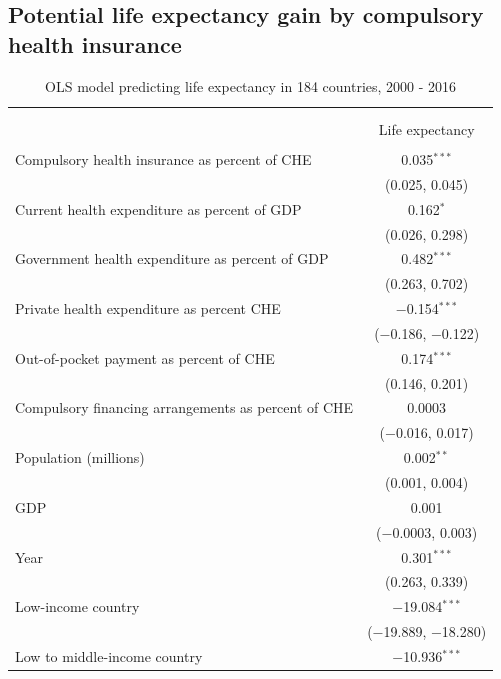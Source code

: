 \documentclass[]{elsarticle} %
\begin{document}
\hypertarget{potential-life-expectancy-gain-by-compulsory-health-insurance}{%
\subsection{Potential life expectancy gain by compulsory health insurance}\label{potential-life-expectancy-gain-by-compulsory-health-insurance}}

\begin{table}[H] \centering 
  \caption{OLS model predicting life expectancy in 184 countries, 2000 - 2016} 
  \label{poolOLS} 
\begin{tabular}{@{\extracolsep{5pt}}lc} 
\\[-1.8ex]\hline \\[-1.8ex] 
\\[-1.8ex] & Life expectancy \\ 
\hline \\[-1.8ex] 
 Compulsory health insurance as percent of CHE & 0.035$^{***}$ \\ 
  & (0.025, 0.045) \\ 
  Current health expenditure as percent of GDP & 0.162$^{*}$ \\ 
  & (0.026, 0.298) \\ 
  Government health expenditure as percent of GDP & 0.482$^{***}$ \\ 
  & (0.263, 0.702) \\ 
  Private health expenditure as percent CHE & $-$0.154$^{***}$ \\ 
  & ($-$0.186, $-$0.122) \\ 
  Out-of-pocket payment as percent of CHE & 0.174$^{***}$ \\ 
  & (0.146, 0.201) \\ 
  Compulsory financing arrangements as percent of CHE & 0.0003 \\ 
  & ($-$0.016, 0.017) \\ 
  Population (millions) & 0.002$^{**}$ \\ 
  & (0.001, 0.004) \\ 
  GDP & 0.001 \\ 
  & ($-$0.0003, 0.003) \\ 
  Year & 0.301$^{***}$ \\ 
  & (0.263, 0.339) \\ 
  Low-income country & $-$19.084$^{***}$ \\ 
  & ($-$19.889, $-$18.280) \\ 
  Low to middle-income country & $-$10.936$^{***}$ \\ 

\end{tabular}
\end{table}
\end{document}

